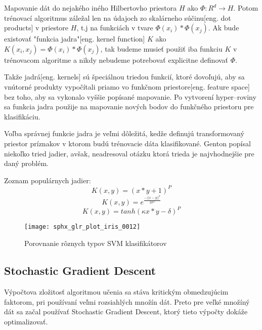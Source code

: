 Mapovanie dát do nejakého iného Hilbertovho priestora \cite{prop:HilbertSpace} $H$ ako $\Phi:R^d \rightarrow H$.
Potom trénovací algoritmus záležal len na údajoch zo skalárneho súčinu[eng. dot products] v priestore $H$, t.j na funkciách v tvare $\Phi(x_i) * \Phi(x_j)$.
Ak bude existovať "funkcia jadra"[eng. kernel function] $K$ ako $K(x_i, x_j) = \Phi(x_i)*\Phi(x_j)$, tak budeme musieť použiť iba funkciu $K$ v trénovacom algoritme
    a nikdy nebudeme potrebovať explicitne definovať $\Phi$\cite{prop:SupervisedMachineLearning}.

Takže jadrá[eng. kernels] sú špeciálnou triedou funkcií, ktoré dovoľujú, aby sa vnútorné produkty vypočítali priamo vo funkčnom priestore[eng. feature space] bez toho, aby sa vykonalo vyššie popísané mapovanie.
Po vytvorení hyper--roviny sa funkcia jadra použije na mapovanie nových bodov do funkčného priestoru pre klasifikáciu\cite{prop:SupervisedMachineLearning}.

Voľba správnej funkcie jadra je veľmi dôležitá, kedže definujú transformovaný priestor príznakov v ktorom budú trénovacie dáta klasifikované.
Genton \cite{prop:KernelClasses} popísal niekoľko tried jadier, avšak, neadresoval otázku ktorá trieda je najvhodnejšie pre daný problém.

Zoznam populárnych jadier\cite{prop:SupervisedMachineLearning}:
\begin{equation}
    K(x, y) = (x*y+1)^P
\end{equation}
\begin{equation}
    K(x, y) = e^{\frac{-||x-y||^2}{2 \sigma^2}}
\end{equation}
\begin{equation}
    K(x, y) = tanh(\kappa x*y - \delta)^P
\end{equation}

\begin{figure}[H]
	\centering
	\texttt{[image: sphx\_glr\_plot\_iris\_0012]}
	\caption{Porovnanie rôznych typov SVM klasifikátorov\cite{odkaz:SVMImage}}
	\label{pic:SVMComparison}
\end{figure}


\subsection{Stochastic Gradient Descent}
Výpočtova zložitosť algoritmou učenia sa stáva kritickým obmedzujúcim faktorom, pri používaní veľmi rozsiahlých množín dát.
Preto pre veľké množíný dát sa začal používať Stochastic Gradient Descent\cite{prop:StochasticGradientDescent}, ktorý tieto výpočty dokáže optimalizovať.

